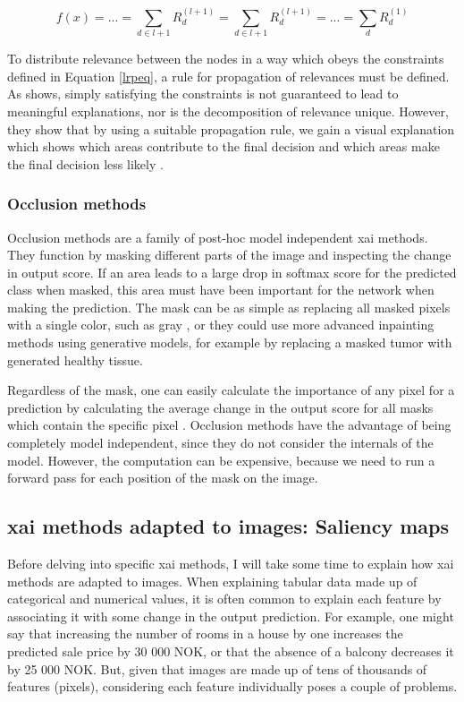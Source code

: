 \documentclass[UKenglish]{uiomasterthesis} %
\theoremstyle{definition}
\begin{document}
\begin{equation}
f(x) = ... = \sum_{d \in l + 1} R^{(l + 1)}_d = \sum_{d \in l + 1} R^{(l + 1)}_d = ... = \sum_d R^{(1)}_d
\label{lrpeq}
\end{equation}

To distribute relevance between the nodes in a way which obeys the constraints defined in Equation \ref{lrpeq}, a rule for propagation of relevances must be defined. As \cite{lrp} shows, simply satisfying the constraints is not guaranteed to lead to meaningful explanations, nor is the decomposition of relevance unique. However, they show that by using a suitable propagation rule, we gain a visual explanation which shows which areas contribute to the final decision and which areas make the final decision less likely \cite[28]{lrp}.
\\


\subsubsection{Occlusion methods}

Occlusion methods are a family of post-hoc model independent \ac{xai} methods. They function by masking different parts of the image and inspecting the change in output score. If an area leads to a large drop in softmax score for the predicted class when masked, this area must have been important for the network when making the prediction. The mask can be as simple as replacing all masked pixels with a single color, such as gray \cite{occlusion}, or they could use more advanced inpainting methods using generative models, for example by replacing a masked tumor with generated healthy tissue. 

Regardless of the mask, one can easily calculate the importance of any pixel for a prediction by calculating the average change in the output score for all masks which contain the specific pixel \cite{diagnostic}. Occlusion methods have the advantage of being completely model independent, since they do not consider the internals of the model. However, the computation can be expensive, because we need to run a forward pass for each position of the mask on the image.

\subsection{\ac{xai} methods adapted to images: Saliency maps}

Before delving into specific \ac{xai} methods, I will take some time to explain how \ac{xai} methods are adapted to images. When explaining tabular data made up of categorical and numerical values, it is often common to explain each feature by associating it with some change in the output prediction. For example, one might say that increasing the number of rooms in a house by one increases the predicted sale price by 30 000 NOK, or that the absence of a balcony decreases it by 25 000 NOK. But, given that images are made up of tens of thousands of features (pixels), considering each feature individually poses a couple of problems.
\end{document}

